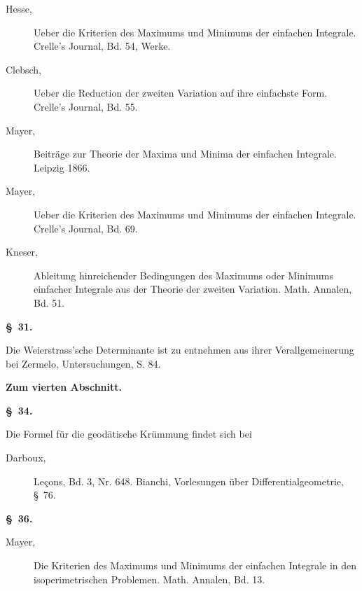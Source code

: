 \documentclass[11pt,a4paper,leqno]{article}
\begin{document}
\begin{description}
\item[Hesse,] Ueber die Kriterien des Maximums und Minimums der einfachen
Integrale. Crelle's Journal, Bd. 54, Werke.

\item[Clebsch,] Ueber die Reduction der zweiten Variation auf ihre einfachste
Form. Crelle's Journal, Bd. 55.

\item[Mayer,] Beiträge zur Theorie der Maxima und Minima der einfachen
Integrale. Leipzig 1866.

\item[Mayer,] Ueber die Kriterien des Maximums und Minimums der einfachen
Integrale. Crelle's Journal, Bd. 69.

\item[Kneser,] Ableitung hinreichender Bedingungen des Maximums oder Minimums
einfacher Integrale aus der Theorie der zweiten Variation. Math. Annalen,
Bd. 51.
\end{description}

\begin{center}{\bfseries \S~31.}\end{center}

\noindent Die Weierstrass'sche Determinante ist zu entnehmen aus ihrer
Verallgemeinerung bei Zermelo, Untersuchungen, S. 84.

\begin{center}
{\large\bfseries Zum vierten Abschnitt.}

{\bfseries \S~34.}
\end{center}

\noindent Die Formel für die geodätische Krümmung findet sich bei

\begin{description}
\item[Darboux,] Leçons, Bd. 3, Nr. 648. Bianchi, Vorlesungen über
Differentialgeometrie, \S~76.
\end{description}

\begin{center}{\bfseries \S~36.}\end{center}

\begin{description}
\item[Mayer,] Die Kriterien des Maximums und Minimums der einfachen Integrale
in den isoperimetrischen Problemen. Math. Annalen, Bd. 13.
\end{description}
\end{document}
